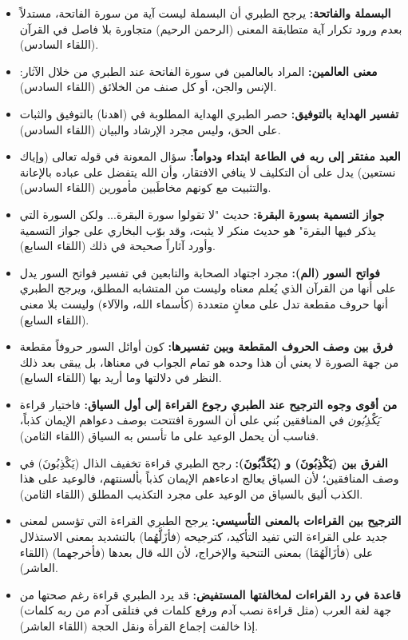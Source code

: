 \begin{itemize}
    \item \textbf{البسملة والفاتحة:} يرجح الطبري أن البسملة ليست آية من سورة الفاتحة، مستدلاً بعدم ورود تكرار آية متطابقة المعنى (الرحمن الرحيم) متجاورة بلا فاصل في القرآن (اللقاء السادس).
    \item \textbf{معنى العالمين:} المراد بالعالمين في سورة الفاتحة عند الطبري من خلال الآثار: الإنس والجن، أو كل صنف من الخلائق (اللقاء السادس).
    \item \textbf{تفسير الهداية بالتوفيق:} حصر الطبري الهداية المطلوبة في (اهدنا) بالتوفيق والثبات على الحق، وليس مجرد الإرشاد والبيان (اللقاء السادس).
    \item \textbf{العبد مفتقر إلى ربه في الطاعة ابتداء ودواماً:} سؤال المعونة في قوله تعالى (وإياك نستعين) يدل على أن التكليف لا ينافي الافتقار، وأن الله يتفضل على عباده بالإعانة والتثبيت مع كونهم مخاطَبين مأمورين (اللقاء السادس).
    \item \textbf{جواز التسمية بسورة البقرة:} حديث "لا تقولوا سورة البقرة... ولكن السورة التي يذكر فيها البقرة" هو حديث منكر لا يثبت، وقد بوّب البخاري على جواز التسمية وأورد آثاراً صحيحة في ذلك (اللقاء السابع).
    \item \textbf{فواتح السور (الم):} مجرد اجتهاد الصحابة والتابعين في تفسير فواتح السور يدل على أنها من القرآن الذي يُعلم معناه وليست من المتشابه المطلق، ويرجح الطبري أنها حروف مقطعة تدل على معانٍ متعددة (كأسماء الله، والآلاء) وليست بلا معنى (اللقاء السابع).
    \item \textbf{فرق بين وصف الحروف المقطعة وبين تفسيرها:} كون أوائل السور حروفاً مقطعة من جهة الصورة لا يعني أن هذا وحده هو تمام الجواب في معناها، بل يبقى بعد ذلك النظر في دلالتها وما أريد بها (اللقاء السابع).
    \item \textbf{من أقوى وجوه الترجيح عند الطبري رجوع القراءة إلى أول السياق:} فاختيار قراءة \textit{يَكْذِبُون} في المنافقين بُني على أن السورة افتتحت بوصف دعواهم الإيمان كذباً، فناسب أن يحمل الوعيد على ما تأسس به السياق (اللقاء الثامن).
    \item \textbf{الفرق بين (يَكْذِبُونَ) و (يُكَذِّبُونَ):} رجح الطبري قراءة تخفيف الذال (يَكْذِبُونَ) في وصف المنافقين؛ لأن السياق يعالج ادعاءهم الإيمان كذباً بألسنتهم، فالوعيد على هذا الكذب أليق بالسياق من الوعيد على مجرد التكذيب المطلق (اللقاء الثامن).
    \item \textbf{الترجيح بين القراءات بالمعنى التأسيسي:} يرجح الطبري القراءة التي تؤسس لمعنى جديد على القراءة التي تفيد التأكيد، كترجيحه (فأزَلَّهُما) بالتشديد بمعنى الاستذلال على (فأزَالَهُمَا) بمعنى التنحية والإخراج، لأن الله قال بعدها (فأخرجهما) (اللقاء العاشر).
    \item \textbf{قاعدة في رد القراءات لمخالفتها المستفيض:} قد يرد الطبري قراءة رغم صحتها من جهة لغة العرب (مثل قراءة نصب آدم ورفع كلمات في فتلقى آدم من ربه كلمات) إذا خالفت إجماع القرأة ونقل الحجة (اللقاء العاشر).

\end{itemize}
